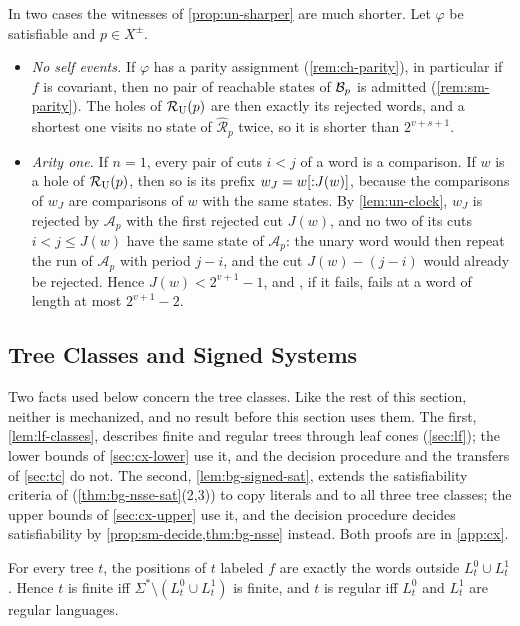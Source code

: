 \begin{remark}\label{rem:un-single}
In two cases the witnesses of \cref{prop:un-sharper} are much shorter. Let
$\varphi$ be satisfiable and $p\in X^\pm$.
\begin{itemize}[leftmargin=*]
\item \emph{No self events.} If $\varphi$ has a parity assignment
  (\cref{rem:ch-parity}), in particular if $f$ is covariant, then no pair of
  reachable states of $\mathcal B_p$ is admitted (\cref{rem:sm-parity}). The holes
  of $\mathcal R_{\mathrm U}(p)$ are then exactly its rejected words, and a shortest one visits no
  state of $\widehat{\mathcal R}_p$ twice, so it is shorter than
  $2^{v+s+1}$.
\item \emph{Arity one.} If $n=1$, every pair of cuts $i<j$ of a word is a
  comparison. If $w$ is a hole of $\mathcal R_{\mathrm U}(p)$, then so is its prefix
  $w_J=w[{:}J(w)]$, because the comparisons of $w_J$ are comparisons of
  $w$ with the same states. By \cref{lem:un-clock}, $w_J$ is rejected by
  $\mathcal A_p$ with the first rejected cut $J(w)$, and no two of its cuts
  $i<j\le J(w)$ have the same state of $\mathcal A_p$: the unary word would
  then repeat the run of $\mathcal A_p$ with period $j-i$, and the cut
  $J(w)-(j-i)$ would already be rejected. Hence $J(w)<2^{v+1}-1$, and \CondU,
  if it fails, fails at a word of length at most $2^{v+1}-2$.
\end{itemize}
\end{remark}

\subsection{Tree Classes and Signed Systems}\label{sec:cx-facts}

Two facts used below concern the tree classes. Like the rest of this section,
neither is mechanized, and no result before this section uses them. The
first, \cref{lem:lf-classes}, describes finite and regular trees through leaf
cones (\cref{sec:lf}); the lower bounds of \cref{sec:cx-lower} use it, and the
decision procedure and the transfers of \cref{sec:tc} do not. The second,
\cref{lem:bg-signed-sat}, extends the satisfiability criteria of
\citet{Zhao26} (\cref{thm:bg-nsse-sat}(2,3)) to copy literals and to all three
tree classes; the upper bounds of \cref{sec:cx-upper} use it, and the decision
procedure decides satisfiability by \cref{prop:sm-decide,thm:bg-nsse} instead.
Both proofs are in \cref{app:cx}.

\begin{lemma}\label{lem:lf-classes}
For every tree $t$, the positions of $t$ labeled $f$ are exactly the words
outside $L^0_t\cup L^1_t$. Hence $t$ is finite iff
$\Sigma^*\setminus(L^0_t\cup L^1_t)$ is finite, and $t$ is regular iff $L^0_t$
and $L^1_t$ are regular languages.
\end{lemma}

